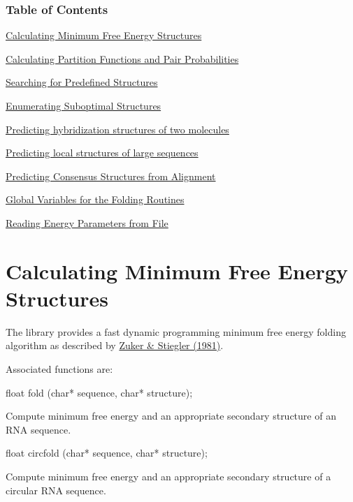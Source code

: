 \label{mp__utils_toc}
\hypertarget{mp__utils_toc}{}


\subsubsection*{Table of Contents}





\begin{DoxyItemize}
\item \hyperlink{mp__fold_mp_mfe_Fold}{Calculating Minimum Free Energy Structures} \item \hyperlink{mp__fold_mp_PF_Fold}{Calculating Partition Functions and Pair Probabilities} \item \hyperlink{mp__fold_mp_Inverse_Fold}{Searching for Predefined Structures} \item \hyperlink{mp__fold_mp_Suboptimal_folding}{Enumerating Suboptimal Structures} \item \hyperlink{mp__fold_mp_Cofolding}{Predicting hybridization structures of two molecules} \item \hyperlink{mp__fold_mp_Local_Fold}{Predicting local structures of large sequences} \item \hyperlink{mp__fold_mp_Alignment_Fold}{Predicting Consensus Structures from Alignment} \item \hyperlink{mp__fold_mp_Fold_Vars}{Global Variables for the Folding Routines} \item \hyperlink{mp__fold_mp_Param_Files}{Reading Energy Parameters from File}\end{DoxyItemize}


\hypertarget{mp__fold_mp_mfe_Fold}{}\section{Calculating Minimum Free Energy Structures}\label{mp__fold_mp_mfe_Fold}
The library provides a fast dynamic programming minimum free energy folding algorithm as described by \hyperlink{mp__ref_zuker_81}{Zuker \& Stiegler (1981)}.

Associated functions are:

\begin{DoxyVerb}
float fold (char* sequence, char* structure);
\end{DoxyVerb}
 Compute minimum free energy and an appropriate secondary structure of an RNA sequence. 

\begin{DoxyVerb}
float circfold (char* sequence, char* structure);
\end{DoxyVerb}
 Compute minimum free energy and an appropriate secondary structure of a circular RNA sequence. 

